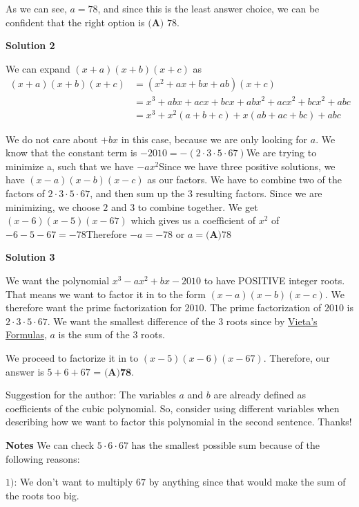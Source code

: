 \begin{enumerate}
 As we can see, $a=78$, and since this is the least answer choice, we can be confident that the right option is $\boxed{\textbf{(A) } 78}$.

 



\textbf{Solution 2}

We can expand $(x+a)(x+b)(x+c)$ as \begin{align*}(x+a)(x+b)(x+c) &= (x^2+ax+bx+ab)(x+c) \\&= x^3+abx+acx+bcx+abx^2+acx^2+bcx^2+abc \\&= x^3+x^2(a+b+c)+x(ab+ac+bc)+abc \end{align*}


 We do not care about $+bx$ in this case, because we are only looking for $a$.  We know that the constant term is $-2010=-(2\cdot 3\cdot 5\cdot 67)$We are trying to minimize a, such that we have $-ax^2$Since we have three positive solutions, we have $(x-a)(x-b)(x-c)$ as our factors.  We have to combine two of the factors of $2\cdot 3\cdot 5\cdot 67$, and then sum up the $3$ resulting factors.  Since we are minimizing, we choose $2$ and $3$ to combine together.  We get $(x-6)(x-5)(x-67)$ which gives us a coefficient of $x^2$ of $-6-5-67=-78$Therefore $-a=-78$ or $a=\boxed{\textbf{(A)}78}$




\textbf{Solution 3}

We want the polynomial $x^3-ax^2+bx-2010$ to have POSITIVE integer roots. That means we want to factor it in to the form $(x-a)(x-b)(x-c).$ We therefore want the prime factorization for $2010$. The prime factorization of $2010$ is $2 \cdot 3 \cdot 5 \cdot 67$. We want the smallest difference of the $3$ roots since by \href{https://artofproblemsolving.com/wiki/index.php?title=Vieta\%27s\_Formulas}{Vieta's Formulas}, $a$ is the sum of the $3$ roots.

 We proceed to factorize it in to $(x-5)(x-6)(x-67)$. Therefore, our answer is $5+6+67$ = $\boxed{\textbf{(A)78}}$.

 
Suggestion for the author: The variables $a$ and $b$ are already defined as coefficients of the cubic polynomial. So, consider using different variables when describing how we want to factor this polynomial in the second sentence. Thanks!

 \textbf{Notes} We can check $5 \cdot 6 \cdot 67$ has the smallest possible sum because of the following reasons:

 $1)$: We don't want to multiply $67$ by anything since that would make the sum of the roots too big.


\end{enumerate}

